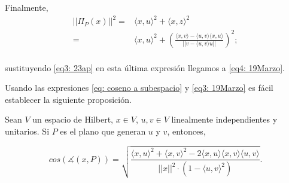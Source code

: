 Finalmente, 
\begin{align*}
|| \Pi_{P}(x) ||^{2} = & 
\langle x,u \rangle^{2} + \langle x,z \rangle^{2} \\
= & \langle x,u \rangle^{2} + 
\left(
\frac{\langle x,v \rangle - \langle u,v \rangle
\langle x,u \rangle}{||v -\langle u,v \rangle u ||}
\right)^{2};\\
\end{align*}

\noindent
sustituyendo \eqref{eq3: 23ap} en esta última expresión
llegamos a \eqref{eq4: 19Marzo}.

\QEDB
\vspace{0.2cm}

Usando las expresiones
\eqref{eq: coseno a subespacio}
y \eqref{eq3: 19Marzo} es fácil establecer
la siguiente proposición.

\begin{prop}
Sean $V$ un espacio de Hilbert, $x \in V$,
	$u,v \in V$ linealmente independientes
	y unitarios. Si $P$ es el plano
	que generan $u$ y $v$, entonces,
	
	
\begin{equation}
\label{eq: coseno a plano}
cos (\measuredangle (x, P)) = 
\sqrt{
\frac{\langle x, u \rangle^{2} +  \langle x, v \rangle^{2}	
	       -2  \langle x, u \rangle \langle x, v \rangle \langle u, v \rangle	}{
	       ||x||^{2} \cdot 
	       (1- \langle u, v 	\rangle^{2})  }}.
\end{equation}
\end{prop}
